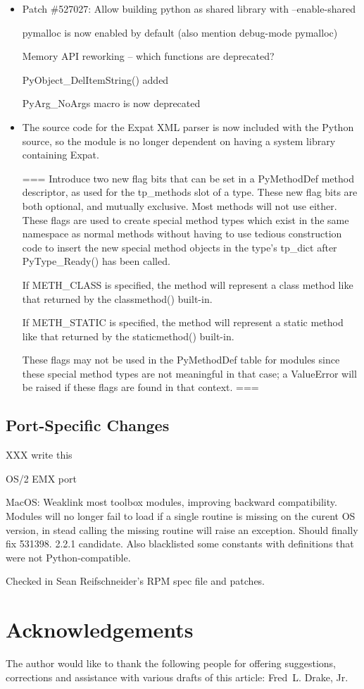 \documentclass{howto}
\begin{document}
\begin{itemize}

\item Patch \#527027: Allow building python as shared library with
--enable-shared

pymalloc is now enabled by default (also mention debug-mode pymalloc)

Memory API reworking -- which functions are deprecated?  

PyObject_DelItemString() added

PyArg_NoArgs macro is now deprecated

\item The source code for the Expat XML parser is now included with
the Python source, so the  module is no longer
dependent on having a system library containing Expat.

===
Introduce two new flag bits that can be set in a PyMethodDef method
descriptor, as used for the tp_methods slot of a type.  These new flag
bits are both optional, and mutually exclusive.  Most methods will not
use either.  These flags are used to create special method types which
exist in the same namespace as normal methods without having to use
tedious construction code to insert the new special method objects in
the type's tp_dict after PyType_Ready() has been called.

If METH_CLASS is specified, the method will represent a class method
like that returned by the classmethod() built-in.

If METH_STATIC is specified, the method will represent a static method
like that returned by the staticmethod() built-in.

These flags may not be used in the PyMethodDef table for modules since
these special method types are not meaningful in that case; a
ValueError will be raised if these flags are found in that context.
===

\end{itemize}

\subsection{Port-Specific Changes}

XXX write this

OS/2 EMX port

MacOS: Weaklink most toolbox modules, improving backward
compatibility. Modules will no longer fail to load if a single routine
is missing on the curent OS version, in stead calling the missing
routine will raise an exception.  Should finally fix 531398. 2.2.1
candidate.  Also blacklisted some constants with definitions that
were not Python-compatible.

Checked in Sean Reifschneider's RPM spec file and patches.


\section{Acknowledgements \label{acks}}

The author would like to thank the following people for offering
suggestions, corrections and assistance with various drafts of this
article: Fred~L. Drake, Jr.
\end{document}
